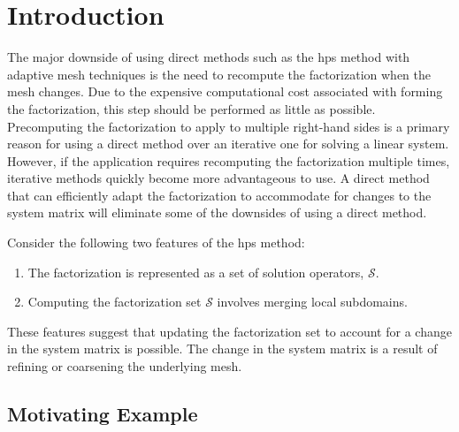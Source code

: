 \section{Introduction}

The major downside of using direct methods such as the \gls{hps} method with adaptive mesh techniques is the need to recompute the factorization when the mesh changes. Due to the expensive computational cost associated with forming the factorization, this step should be performed as little as possible. Precomputing the factorization to apply to multiple right-hand sides is a primary reason for using a direct method over an iterative one for solving a linear system. However, if the application requires recomputing the factorization multiple times, iterative methods quickly become more advantageous to use. A direct method that can efficiently adapt the factorization to accommodate for changes to the system matrix will eliminate some of the downsides of using a direct method.

Consider the following two features of the \gls{hps} method:
\begin{enumerate}
    \item{The factorization is represented as a set of solution operators, $\mathcal{S}$.}
    \item{Computing the factorization set $\mathcal{S}$ involves merging local subdomains.}
\end{enumerate}
These features suggest that updating the factorization set to account for a change in the system matrix is possible. The change in the system matrix is a result of refining or coarsening the underlying mesh. 

\subsection{Motivating Example}

